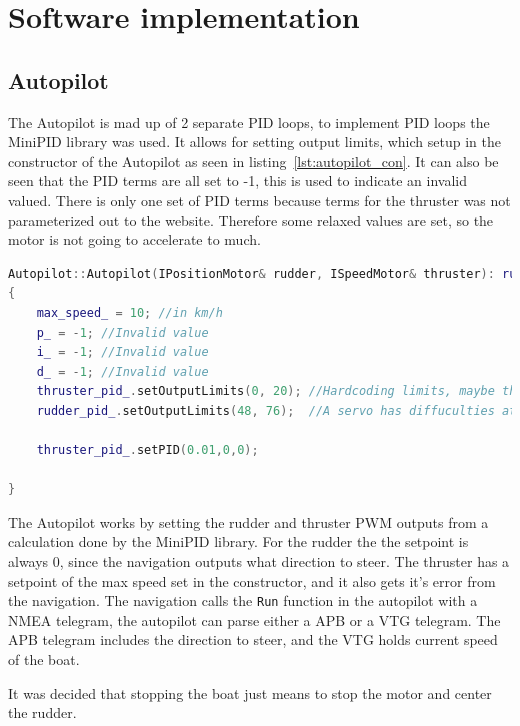 \section{Software implementation}
\label{sec:software_implementation}
\subsection{Autopilot}
The Autopilot is mad up of 2 separate PID loops, to implement PID loops the MiniPID library was used\cite{minipid}. It allows for setting output limits, which setup in the constructor of the Autopilot as seen in listing~\ref{lst:autopilot_con}. It can also be seen that the PID terms are all set to -1, this is used to indicate an invalid valued. There is only one set of PID terms because terms for the thruster was not parameterized out to the website. Therefore some relaxed values are set, so the motor is not going to accelerate to much. 

\begin{lstlisting}[caption = {Constructor method of the Autopilot}, captionpos=b, label={lst:autopilot_con}, language=C++,firstnumber=1]
Autopilot::Autopilot(IPositionMotor& rudder, ISpeedMotor& thruster): rudder_pid_(0, 0, 0), thruster_pid_(1,0,0), rudder_(rudder), thruster_(thruster)
{
	max_speed_ = 10; //in km/h
	p_ = -1; //Invalid value
	i_ = -1; //Invalid value
	d_ = -1; //Invalid value
	thruster_pid_.setOutputLimits(0, 20); //Hardcoding limits, maybe this should be done through the user interface
	rudder_pid_.setOutputLimits(48, 76);  //A servo has diffuculties at the edges ei. 0 and 90 so it is limited

	thruster_pid_.setPID(0.01,0,0);

}
\end{lstlisting}

The Autopilot works by setting the rudder and thruster PWM outputs from a calculation done by the MiniPID library. For the rudder the the setpoint is always 0, since the navigation outputs what direction to steer. The thruster has a setpoint of the max speed set in the constructor, and it also gets it's error from the navigation. The navigation calls the \texttt{Run} function in the autopilot with a NMEA telegram, the autopilot can parse either a APB or a VTG telegram. The APB telegram includes the direction to steer, and the VTG holds current speed of the boat. 

It was decided that stopping the boat just means to stop the motor and center the rudder. 

